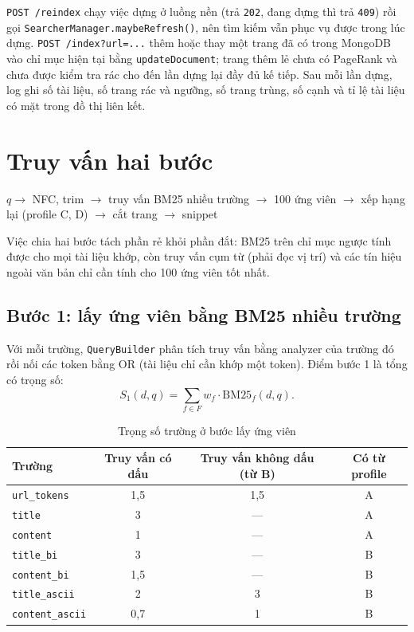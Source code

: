 \documentclass[12pt,a4paper]{report}
\begin{document}
\texttt{POST /reindex} chạy việc dựng ở luồng nền (trả \texttt{202}, đang dựng thì trả \texttt{409}) rồi gọi
\texttt{SearcherManager.maybeRefresh()}, nên tìm kiếm vẫn phục vụ được trong lúc dựng. \texttt{POST /index?url=...} thêm
hoặc thay một trang đã có trong MongoDB vào chỉ mục hiện tại bằng \texttt{updateDocument}; trang thêm lẻ chưa có
PageRank và chưa được kiểm tra rác cho đến lần dựng lại đầy đủ kế tiếp. Sau mỗi lần dựng, log ghi số tài liệu, số trang
rác và ngưỡng, số trang trùng, số cạnh và tỉ lệ tài liệu có mặt trong đồ thị liên kết.

\section{Truy vấn hai bước}

\begin{center}
\small
$q \rightarrow$ NFC, trim $\rightarrow$ truy vấn BM25 nhiều trường $\rightarrow$ 100 ứng viên $\rightarrow$
xếp hạng lại (profile C, D) $\rightarrow$ cắt trang $\rightarrow$ snippet
\end{center}

Việc chia hai bước tách phần rẻ khỏi phần đắt: BM25 trên chỉ mục ngược tính được cho mọi tài liệu khớp, còn truy vấn
cụm từ (phải đọc vị trí) và các tín hiệu ngoài văn bản chỉ cần tính cho 100 ứng viên tốt nhất.

\subsection{Bước 1: lấy ứng viên bằng BM25 nhiều trường}

Với mỗi trường, \texttt{QueryBuilder} phân tích truy vấn bằng analyzer của trường đó rồi nối các token bằng OR (tài
liệu chỉ cần khớp một token). Điểm bước 1 là tổng có trọng số:
\begin{equation}
S_1(d, q) = \sum_{f \in F} w_f \cdot \mathrm{BM25}_f(d, q).
\end{equation}

\begin{table}[ht]
\centering
\caption{Trọng số trường ở bước lấy ứng viên}\label{tab:weights}
\begin{tabular}{l c c c}
\toprule
Trường & Truy vấn có dấu & Truy vấn không dấu (từ B) & Có từ profile \\
\midrule
\texttt{url\_\allowbreak{}tokens} & 1,5 & 1,5 & A \\
\texttt{title} & 3 & --- & A \\
\texttt{content} & 1 & --- & A \\
\texttt{title\_\allowbreak{}bi} & 3 & --- & B \\
\texttt{content\_\allowbreak{}bi} & 1,5 & --- & B \\
\texttt{title\_\allowbreak{}ascii} & 2 & 3 & B \\
\texttt{content\_\allowbreak{}ascii} & 0,7 & 1 & B \\
\bottomrule
\end{tabular}
\end{table}
\end{document}
